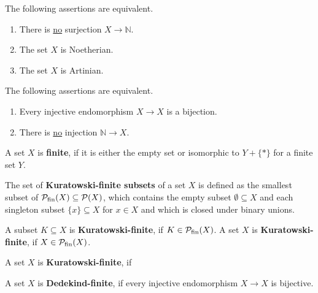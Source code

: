 \documentclass{article}
\begin{document}
	\begin{lemma}[MO410013]
		The following assertions are equivalent.
		\begin{enumerate}
			\item{
				There is \underline{no} surjection $X \rightarrow \mathbb{N}$.
			}
			\item{
				The set $X$ is Noetherian.
			}
			\item{
				The set $X$ is Artinian.
			}
		\end{enumerate}
	\end{lemma}

	\begin{lemma}[MO410013]
		The following assertions are equivalent.
		\begin{enumerate}
			\item{
				Every injective endomorphism $X\rightarrow X$ is a bijection.
			}
			\item{
				There is \underline{no} injection $\mathbb{N} \rightarrow X$.
			}
		\end{enumerate}
	\end{lemma}

	\begin{definition}
		A set $X$ is \textbf{finite}, if it is either the empty set or isomorphic to $Y + \{\ast\}$ for a finite set $Y$.
	\end{definition}

	\begin{definition}
		The set of \textbf{Kuratowski-finite subsets} of a set $X$ is defined as the smallest subset of $\mathcal{P}_{\text{fin}}(X)\subseteq\mathcal{P}(X)$, which contains the empty subset $\emptyset\subseteq X$ and each singleton subset $\{x\} \subseteq X$ for $x\in X$ and which is closed under binary unions. 

		A subset $K\subseteq X$ is \textbf{Kuratowski-finite}, if $K \in \mathcal{P}_{\text{fin}}(X)$. A set $X$ is \textbf{Kuratowski-finite}, if $X \in \mathcal{P}_{\text{fin}}(X)$.
	\end{definition}

	\begin{definition}
		A set $X$ is \textbf{Kuratowski-finite}, if \TODO{no NNO! see Ortega}
	\end{definition}

	\begin{definition}
		A set $X$ is \textbf{Dedekind-finite}, if every injective endomorphism $X\rightarrow X$ is bijective.
	\end{definition}
\end{document}
